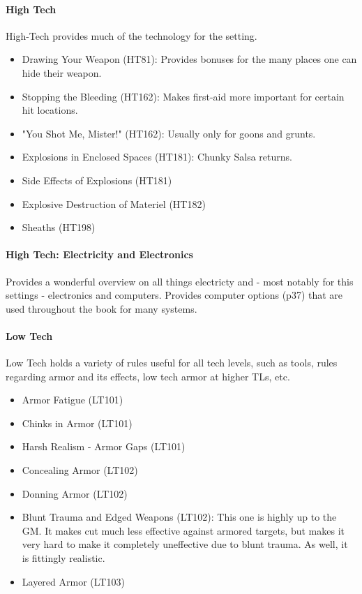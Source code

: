 \begin{multicols*}{3}
	\paragraph{\GURPS High Tech}
	\GURPS High-Tech provides much of the technology for the setting.
	\begin{itemize}
		\itemsep0em 
		\item Drawing Your Weapon (HT81): Provides bonuses for the many places one can hide their weapon.
		\item Stopping the Bleeding (HT162): Makes first-aid more important for certain hit locations.
		\item "You Shot Me, Mister!" (HT162): Usually only for goons and grunts.
		\item Explosions in Enclosed Spaces (HT181): Chunky Salsa returns.
		\item Side Effects of Explosions (HT181)
		\item Explosive Destruction of Materiel (HT182)
		\item Sheaths (HT198)
	\end{itemize}

	\paragraph{\GURPS High Tech: Electricity and Electronics}
	Provides a wonderful overview on all things electricty and - most notably for this settings - electronics and computers. Provides computer options (p37) that are used throughout the book for many systems.
	
	\paragraph{\GURPS Low Tech}
	\GURPS Low Tech holds a variety of rules useful for all tech levels, such as tools, rules regarding armor and its effects, low tech armor at higher TLs, etc.
	
	\begin{itemize}
		\itemsep0em 
		\item Armor Fatigue (LT101)
		\item Chinks in Armor (LT101)
		\item Harsh Realism - Armor Gaps (LT101)
		\item Concealing Armor (LT102)
		\item Donning Armor (LT102)
		\item Blunt Trauma and Edged Weapons (LT102): This one is highly up to the GM. It makes cut much less effective against armored targets, but makes it very hard to make it completely uneffective due to blunt trauma. As well, it is fittingly realistic.
		\item Layered Armor (LT103)
	\end{itemize}
	

\end{multicols*}
